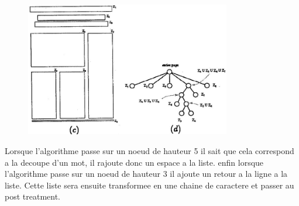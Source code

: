 \begin{figure}[h]
    \centering
    \includegraphics[width =0.80\textwidth]{dst3.jpg}
\end{figure}
Lorsque l'algorithme passe sur un noeud de hauteur 5 il sait que cela correspond a la decoupe d'un mot, il rajoute donc un espace a la liste. enfin lorsque l'algorithme passe sur un noeud de hauteur 3 il ajoute un retour a la ligne a la liste. Cette liste sera ensuite transformee en une chaine de caractere et passer au post treatment.\\



\newpage

